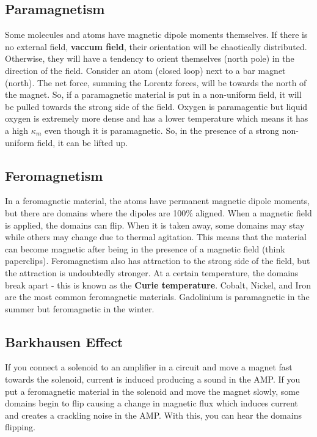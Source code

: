 \documentclass{article}
\begin{document}
\subsection{Paramagnetism}
Some molecules and atoms have magnetic dipole moments themselves. If there is no external field, \textbf{vaccum field},
their orientation will be chaotically distributed. Otherwise, they will have a tendency to orient themselves (north pole)
in the direction of the field. Consider an atom (closed loop) next to a bar magnet (north). The net force, summing the Lorentz forces,
will be towards the north of the magnet. So, if a paramagnetic material is put in a non-uniform field, it will be pulled towards 
the strong side of the field. Oxygen is paramagentic but liquid oxygen is extremely more dense and has a lower temperature which means
it has a high $\kappa_{m}$ even though it is paramagnetic. So, in the presence of a strong non-uniform field, it can be lifted up.

\subsection{Feromagnetism}
In a feromagnetic material, the atoms have permanent magnetic dipole moments, but there are domains where the dipoles are 100\% aligned.
When a magnetic field is applied, the domains can flip. When it is taken away, some domains may stay while others may change due to thermal agitation.
This means that the material can become magnetic after being in the presence of a magnetic field (think paperclips).
Feromagnetism also has attraction to the strong side of the field, but the attraction is undoubtedly stronger.
At a certain temperature, the domains break apart - this is known as the \textbf{Curie temperature}.
Cobalt, Nickel, and Iron are the most common feromagnetic materials. Gadolinium is paramagnetic in the summer but feromagnetic in the winter.

\subsection{Barkhausen Effect}
If you connect a solenoid to an amplifier in a circuit and move a magnet fast towards the solenoid, current is induced producing a sound in the AMP.
If you put a feromagnetic material in the solenoid and move the magnet slowly, some domains begin to flip causing a change in magnetic flux 
which induces current and creates a crackling noise in the AMP. With this, you can hear the domains flipping.
\end{document}
